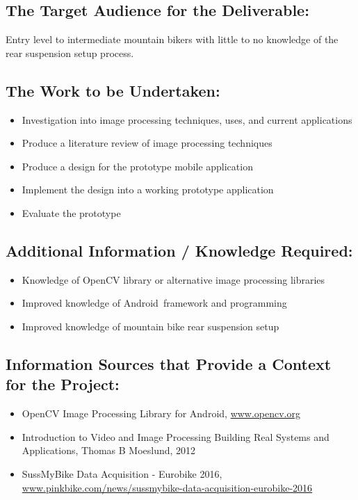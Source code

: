 \documentclass[a4paper, 12pt]{article}
\begin{document}
	\subsection[Audience]{The Target Audience for the Deliverable:}
	Entry level to intermediate mountain bikers with little to no knowledge of the rear suspension setup process.
	
	\subsection[Work]{The Work to be Undertaken:}
	\begin{itemize}
		\item Investigation into image processing techniques, uses, and current applications
		\item Produce a literature review of image processing techniques
		\item Produce a design for the prototype mobile application
		\item Implement the design into a working prototype application
		\item Evaluate the prototype
	\end{itemize}
	
	\subsection[Additional Info]{Additional Information / Knowledge Required:}
	\begin{itemize}
		\item Knowledge of OpenCV library or alternative image processing libraries
		\item Improved knowledge of Android\texttrademark\ framework and programming
		\item Improved knowledge of mountain bike rear suspension setup
	\end{itemize}
	
	\subsection[Sources]{Information Sources that Provide a Context for the Project:}
	\begin{itemize}
		\item OpenCV Image Processing Library for Android\texttrademark, \href{www.opencv.org}{www.opencv.org}
		\item Introduction to Video and Image Processing Building Real Systems and Applications, Thomas B Moeslund, 2012
		\item SussMyBike Data Acquisition - Eurobike 2016,\newline
		\href{www.pinkbike.com/news/sussmybike-data-acquisition-eurobike-2016}{www.pinkbike.com/news/sussmybike-data-acquisition-eurobike-2016}
	\end{itemize}
	
\end{document}
